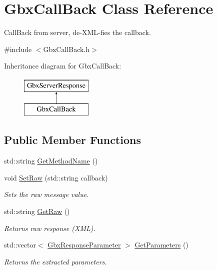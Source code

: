 \hypertarget{classGbxCallBack}{\section{Gbx\-Call\-Back Class Reference}
\label{classGbxCallBack}
}


Call\-Back from server, de-\/\-X\-M\-L-\/fies the callback.  




{\ttfamily \#include $<$Gbx\-Call\-Back.\-h$>$}

Inheritance diagram for Gbx\-Call\-Back\-:\begin{figure}[H]
\begin{center}
\leavevmode
\includegraphics[height=2.000000cm]{classGbxCallBack}
\end{center}
\end{figure}
\subsection*{Public Member Functions}
\begin{DoxyCompactItemize}
\item 
std\-::string \hyperlink{classGbxCallBack_aaf01544527ca0559478221780b3f32f6}{Get\-Method\-Name} ()
\item 
void \hyperlink{classGbxCallBack_a9382de8d43cae9e7a9acd384146c2900}{Set\-Raw} (std\-::string callback)
\begin{DoxyCompactList}\small\item\em Sets the raw message value. \end{DoxyCompactList}\item 
std\-::string \hyperlink{classGbxServerResponse_aa449d9a63899e1d1205e6ab916798ba6}{Get\-Raw} ()
\begin{DoxyCompactList}\small\item\em Returns raw response (X\-M\-L). \end{DoxyCompactList}\item 
std\-::vector$<$ \hyperlink{classGbxResponseParameter}{Gbx\-Response\-Parameter} $>$ \hyperlink{classGbxServerResponse_a6d42bdaaeff3368e1fab2984940d2a2c}{Get\-Parameters} ()
\begin{DoxyCompactList}\small\item\em Returns the extracted parameters. \end{DoxyCompactList}\end{DoxyCompactItemize}
